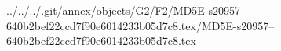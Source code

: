 ../../../.git/annex/objects/G2/F2/MD5E-s20957--640b2bef22ccd7f90e6014233b05d7c8.tex/MD5E-s20957--640b2bef22ccd7f90e6014233b05d7c8.tex